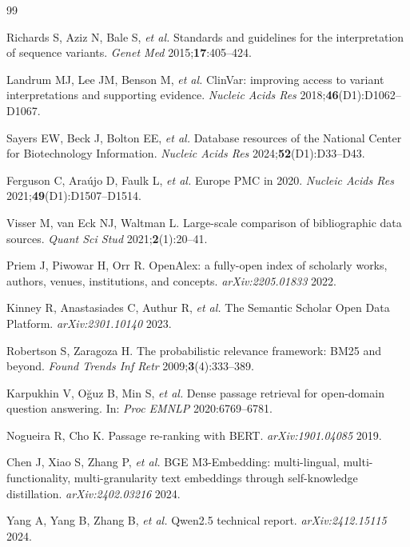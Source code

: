 \documentclass[10pt,twocolumn,letterpaper]{article}
\begin{document}
\begin{thebibliography}{99}
\scriptsize
\setlength{\itemsep}{-1pt}
\setlength{\parskip}{0pt}

 Richards S, Aziz N, Bale S, \textit{et al.} Standards
and guidelines for the interpretation of sequence variants. \textit{Genet Med}
2015;\textbf{17}:405--424.

 Landrum MJ, Lee JM, Benson M, \textit{et al.} ClinVar:
improving access to variant interpretations and supporting evidence.
\textit{Nucleic Acids Res} 2018;\textbf{46}(D1):D1062--D1067.

 Sayers EW, Beck J, Bolton EE, \textit{et al.} Database
resources of the National Center for Biotechnology Information.
\textit{Nucleic Acids Res} 2024;\textbf{52}(D1):D33--D43.

 Ferguson C, Ara\'ujo D, Faulk L, \textit{et al.} Europe
PMC in 2020. \textit{Nucleic Acids Res} 2021;\textbf{49}(D1):D1507--D1514.

 Visser M, van Eck NJ, Waltman L. Large-scale comparison of
bibliographic data sources. \textit{Quant Sci Stud} 2021;\textbf{2}(1):20--41.

 Priem J, Piwowar H, Orr R. OpenAlex: a fully-open index of
scholarly works, authors, venues, institutions, and concepts.
\textit{arXiv:2205.01833} 2022.

 Kinney R, Anastasiades C, Authur R, \textit{et al.} The
Semantic Scholar Open Data Platform. \textit{arXiv:2301.10140} 2023.

 Robertson S, Zaragoza H. The probabilistic relevance
framework: BM25 and beyond. \textit{Found Trends Inf Retr}
2009;\textbf{3}(4):333--389.

 Karpukhin V, O\u{g}uz B, Min S, \textit{et al.} Dense
passage retrieval for open-domain question answering. In: \textit{Proc EMNLP}
2020:6769--6781.

 Nogueira R, Cho K. Passage re-ranking with BERT.
\textit{arXiv:1901.04085} 2019.

 Chen J, Xiao S, Zhang P, \textit{et al.} BGE M3-Embedding:
multi-lingual, multi-functionality, multi-granularity text embeddings through
self-knowledge distillation. \textit{arXiv:2402.03216} 2024.

 Yang A, Yang B, Zhang B, \textit{et al.} Qwen2.5 technical
report. \textit{arXiv:2412.15115} 2024.

\end{thebibliography}
\end{document}
